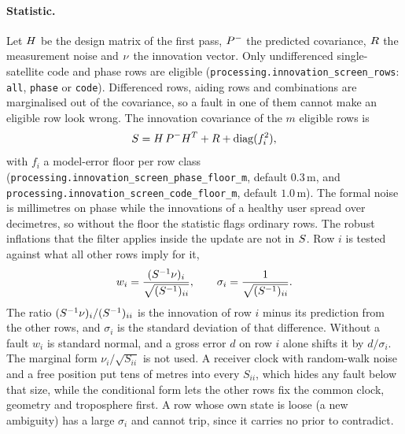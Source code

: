 \documentclass[main.tex]{subfiles}
\begin{document}
\paragraph{Statistic.}
Let $H$ be the design matrix of the first pass, $P^{-}$ the predicted
covariance, $R$ the measurement noise and $\nu$ the innovation vector.
Only undifferenced single-satellite code and phase rows are eligible
(\texttt{processing.innovation\_screen\_rows}: \texttt{all}, \texttt{phase} or
\texttt{code}).  Differenced rows, aiding rows and combinations are
marginalised out of the covariance, so a fault in one of them cannot make an
eligible row look wrong.  The innovation covariance of the $m$ eligible rows is
\begin{equation}
S = H\,P^{-}H^{T} + R + \operatorname{diag}(f_i^{2}),
\label{eq:rt-screen-S}
\end{equation}
with $f_i$ a model-error floor per row class
(\texttt{processing.innovation\_screen\_phase\_floor\_m}, default $0.3$\,m, and
\texttt{processing.innovation\_screen\_code\_floor\_m}, default $1.0$\,m).  The
formal noise is millimetres on phase while the innovations of a healthy user
spread over decimetres, so without the floor the statistic flags ordinary rows.
The robust inflations that the filter applies inside the update are not in
$S$.  Row $i$ is tested against what all other rows imply for it,
\begin{equation}
w_i = \frac{(S^{-1}\nu)_i}{\sqrt{(S^{-1})_{ii}}},
\qquad
\sigma_i = \frac{1}{\sqrt{(S^{-1})_{ii}}} .
\label{eq:rt-screen-w}
\end{equation}
The ratio $(S^{-1}\nu)_i / (S^{-1})_{ii}$ is the innovation of row
$i$ minus its prediction from the other rows, and $\sigma_i$ is the standard
deviation of that difference.  Without a fault $w_i$ is standard normal, and a
gross error $d$ on row $i$ alone shifts it by $d/\sigma_i$.  The marginal form
$\nu_i/\sqrt{S_{ii}}$ is not used.  A receiver clock with random-walk noise and
a free position put tens of metres into every $S_{ii}$, which hides any fault
below that size, while the conditional form lets the other rows fix the common
clock, geometry and troposphere first.  A row whose own state is loose (a new
ambiguity) has a large $\sigma_i$ and cannot trip, since it carries no prior to
contradict.
\end{document}
